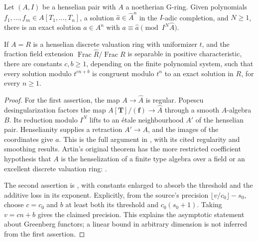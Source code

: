 \begin{theorem}\label{thm:B3-approx}
Let $(A,I)$ be a henselian pair with $A$ a noetherian G-ring. Given
polynomials $f_1,\ldots,f_m\in A[T_1,\ldots,T_n]$, a solution
$\widehat a\in\widehat A^n$ in the $I$-adic completion, and $N\ge1$,
there is an exact solution $a\in A^n$ with
$a\equiv\widehat a\pmod{I^N\widehat A}$.

If $A=R$ is a henselian discrete valuation ring with uniformizer $t$,
and the fraction field extension $\operatorname{Frac}\widehat R/
\operatorname{Frac}R$ is separable in positive characteristic, there
are constants $c,b\ge1$, depending on the finite polynomial system,
such that every solution modulo $t^{cn+b}$ is congruent modulo $t^n$
to an exact solution in $R$, for every $n\ge1$.
\end{theorem}
\begin{proof}
For the first assertion, the map $A\to\widehat A$ is regular.
Popescu desingularization factors the map
$A[\mathbf T]/(\mathbf f)\to\widehat A$ through a smooth
$A$-algebra $B$. Its reduction modulo $I^N$ lifts to an \'etale
neighbourhood $A'$ of the henselian pair. Henselianity supplies a
retraction $A'\to A$, and the images of the coordinates give $a$.
This is the full argument in
\cite[Lemma 16.14.1, tag 0AH5]{BStacks}, with its cited regularity
and smoothing results. Artin's original theorem has the more
restricted coefficient hypothesis that $A$ is the henselization of
a finite type algebra over a field or an excellent discrete valuation
ring: \cite[Theorems 1.10 and 1.12, p.~26]{BArtin1969}.

The second assertion is \cite[Theorem 1 and Corollary 1,
p.~59]{BGreenberg1966}, with constants enlarged to absorb the
threshold and the additive loss in its exponent. Explicitly, from
the source's precision $\lfloor v/c_0\rfloor-s_0$, choose
$c=c_0$ and $b$ at least both its threshold and $c_0(s_0+1)$.
Taking $v=cn+b$ gives the claimed precision. This explains the
asymptotic statement about Greenberg functors; a linear bound in
arbitrary dimension is not inferred from the first assertion.
\end{proof}

